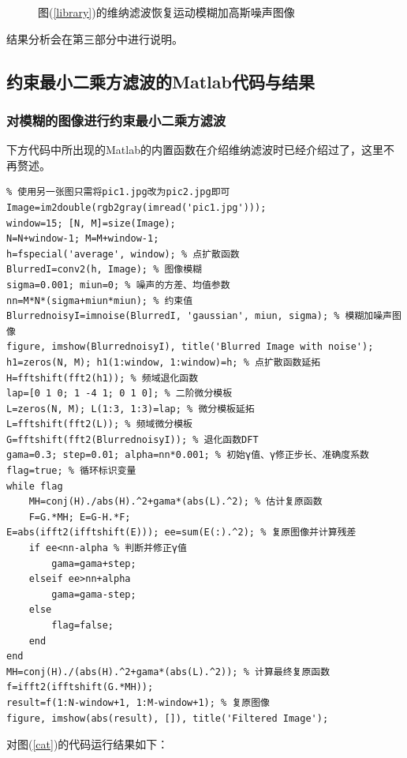 \documentclass[UTF8]{ctexart}
\begin{document}
\begin{figure}[htbp]
{        }
        \caption{图(\ref{library})的维纳滤波恢复运动模糊加高斯噪声图像}
        \label{libraryweina2}
    \end{figure}

    结果分析会在第三部分中进行说明。
    \subsection{约束最小二乘方滤波的Matlab代码与结果}
    \subsubsection{对模糊的图像进行约束最小二乘方滤波}
    下方代码中所出现的Matlab的内置函数在介绍维纳滤波时已经介绍过了，这里不再赘述。
    \clearpage
    \begin{lstlisting}
% 使用另一张图只需将pic1.jpg改为pic2.jpg即可
Image=im2double(rgb2gray(imread('pic1.jpg')));
window=15; [N, M]=size(Image);
N=N+window-1; M=M+window-1;
h=fspecial('average', window); % 点扩散函数
BlurredI=conv2(h, Image); % 图像模糊
sigma=0.001; miun=0; % 噪声的方差、均值参数
nn=M*N*(sigma+miun*miun); % 约束值
BlurrednoisyI=imnoise(BlurredI, 'gaussian', miun, sigma); % 模糊加噪声图像
figure, imshow(BlurrednoisyI), title('Blurred Image with noise');
h1=zeros(N, M); h1(1:window, 1:window)=h; % 点扩散函数延拓
H=fftshift(fft2(h1)); % 频域退化函数
lap=[0 1 0; 1 -4 1; 0 1 0]; % 二阶微分模板
L=zeros(N, M); L(1:3, 1:3)=lap; % 微分模板延拓
L=fftshift(fft2(L)); % 频域微分模板
G=fftshift(fft2(BlurrednoisyI)); % 退化函数DFT
gama=0.3; step=0.01; alpha=nn*0.001; % 初始γ值、γ修正步长、准确度系数
flag=true; % 循环标识变量
while flag
    MH=conj(H)./abs(H).^2+gama*(abs(L).^2); % 估计复原函数
    F=G.*MH; E=G-H.*F;
E=abs(ifft2(ifftshift(E))); ee=sum(E(:).^2); % 复原图像并计算残差
    if ee<nn-alpha % 判断并修正γ值
        gama=gama+step;
    elseif ee>nn+alpha
        gama=gama-step;
    else
        flag=false;
    end
end
MH=conj(H)./(abs(H).^2+gama*(abs(L).^2)); % 计算最终复原函数
f=ifft2(ifftshift(G.*MH));
result=f(1:N-window+1, 1:M-window+1); % 复原图像
figure, imshow(abs(result), []), title('Filtered Image');
    \end{lstlisting}
    \clearpage
    对图(\ref{cat})的代码运行结果如下：
\end{document}
